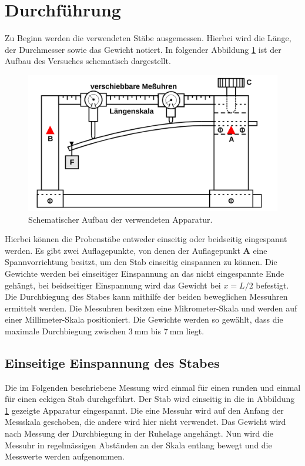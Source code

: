 \section{Durchführung}
\label{sec:Durchführung}
Zu Beginn werden die verwendeten Stäbe ausgemessen. Hierbei wird die Länge, der
Durchmesser sowie das Gewicht notiert.
In folgender Abbildung \ref{fig:aufbau} ist der Aufbau des Versuches schematisch dargestellt.
\begin{figure}[H]
  \centering
  \includegraphics[scale=0.4]{content/versuchsaufbau.png}
  \caption{Schematischer Aufbau der verwendeten Apparatur.}
  \label{fig:aufbau}
\end{figure}
\noindent
Hierbei können die Probenstäbe entweder einseitig oder beidseitig eingespannt
werden. Es gibt zwei Auflagepunkte, von denen der Auflagepunkt \textbf{A} eine
Spannvorrichtung besitzt, um den Stab einseitig einspannen zu können.
Die Gewichte werden bei einseitiger Einspannung an das nicht eingespannte
Ende gehängt, bei beidseitiger Einspannung wird das Gewicht bei $x = L/2$ befestigt.
Die Durchbiegung des Stabes kann mithilfe der beiden beweglichen Messuhren ermittelt werden.
Die Messuhren besitzen eine Mikrometer-Skala und werden auf einer Millimeter-Skala positioniert.
Die Gewichte werden so gewählt, dass die maximale Durchbiegung zwischen $\SI{3}{\milli\meter}$ bis
$\SI{7}{\milli\meter}$ liegt.

\subsection{Einseitige Einspannung des Stabes}
Die im Folgenden beschriebene Messung wird einmal für einen runden und einmal für
einen eckigen Stab durchgeführt. Der Stab wird einseitig in die in Abbildung \ref{fig:aufbau}
gezeigte Apparatur eingespannt. Die eine Messuhr wird auf den Anfang der Messskala
geschoben, die andere wird hier nicht verwendet. Das Gewicht wird nach Messung der
Durchbiegung in der Ruhelage angehängt. Nun wird die Messuhr in regelmässigen Abständen
an der Skala entlang bewegt und die Messwerte werden aufgenommen. 

